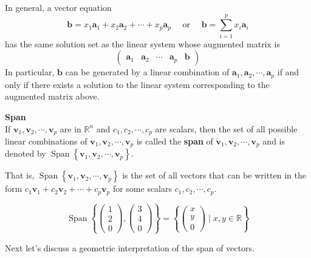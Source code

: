 \documentclass[10pt, a4paper]{article}
\begin{document}
\indent In general, a vector equation $$\mathbf{b}=x_1 \mathbf{a}_1+x_2 \mathbf{a}_2+\cdots+x_p \mathbf{a}_p \quad \text { or } \quad \mathbf{b}=\sum_{i=1}^{p} x_i \mathbf{a}_i $$ has the same solution set as the linear system whose augmented matrix is $$ \begin{pmatrix} \mathbf{a}_1 & \mathbf{a}_2 & \cdots & \mathbf{a}_p & \mathbf{b} \end{pmatrix} $$
In particular, $\mathbf{b}$ can be generated by a linear combination of $\mathbf{a}_1, \mathbf{a}_2, \cdots, \mathbf{a}_p$ if and only if there exists a solution to the linear system corresponding to the augmented matrix above.\\
\begin{definition}
    \textbf{Span}\\
    If $\mathbf{v}_1, \mathbf{v}_2, \cdots, \mathbf{v}_p$ are in $\mathbb{R}^n$ and $c_1, c_2, \cdots, c_p$ are scalars, then the set of all possible linear combinations of $\mathbf{v}_1, \mathbf{v}_2, \cdots, \mathbf{v}_p$ is called the \textbf{span} of $\mathbf{v}_1, \mathbf{v}_2, \cdots, \mathbf{v}_p$ and is denoted by $\operatorname{Span}\left\{\mathbf{v}_1, \mathbf{v}_2, \cdots, \mathbf{v}_p\right\}$.
\end{definition}
\indent That is, $\operatorname{Span}\left\{\mathbf{v}_1, \mathbf{v}_2, \cdots, \mathbf{v}_p\right\}$ is the set of all vectors that can be written in the form $c_1 \mathbf{v}_1+c_2 \mathbf{v}_2+\cdots+c_p \mathbf{v}_p$ for some scalars $c_1, c_2, \cdots, c_p$.\\
\begin{example}
    \begin{equation*}
        \operatorname{Span} \left\{ \begin{pmatrix}
            1 \\ 2 \\0
        \end{pmatrix}, \begin{pmatrix}
            3 \\ 4 \\0
        \end{pmatrix} \right\}
        =\left\{ \begin{pmatrix}
            x \\ y \\0
        \end{pmatrix} \mid x, y \in \mathbb{R} \right\}
    \end{equation*}
\end{example}
\indent Next let's discuss a geometric interpretation of the span of vectors.
\end{document}
